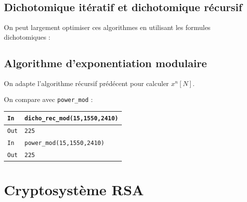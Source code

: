 \documentclass[titlepage]{article}
\begin{document}
    

    

    \subsection{Dichotomique itératif et dichotomique récursif}

    On peut largement optimiser ces algorithmes en utilisant \- les formules dichotomiques : 

    

    

    \subsection{Algorithme d'exponentiation modulaire}
    On adapte l'algorithme récursif prédécent pour calculer $x^n [N]$.

    

    On compare avec \texttt{power\_mod} :\bigbreak

    \begin{tabularx}{12cm}{|p{0.60cm}|X|}
        \hline
        \rowcolor{gray}
        \texttt{In}
        & 
        \texttt{dicho\_rec\_mod(15,1550,2410)}
        \\
        \hline
        \texttt{Out}
        &
        \texttt{225}
        \\
        \hline
        \rowcolor{gray}
        \texttt{In}
        & 
        \texttt{power\_mod(15,1550,2410)}
        \\
        \hline
        \texttt{Out}
        &
        \texttt{225}
        \\
        \hline
    \end{tabularx}
    \bigbreak

    \section{Cryptosystème RSA}
\end{document}
